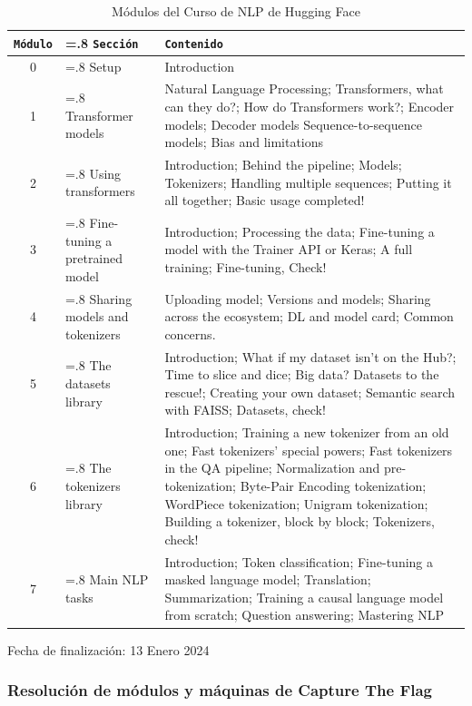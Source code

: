 \begin{table}[H] 
\centering
\footnotesize
\label{tab:nlp_course_structure}
\begin{tabularx}{\textwidth}{|c|>{\hsize=.8\hsize}X|>{\hsize=1.2\hsize}X|}
\hline
\rowcolor{graylight}\texttt{Módulo} & \texttt{Sección} & \texttt{Contenido} \\
\hline
0 & Setup & Introduction \\
\hline
1 & Transformer models & Natural Language Processing; Transformers, what can they do?; How do Transformers work?; Encoder models; Decoder models
Sequence-to-sequence models; Bias and limitations \\
\hline
2 & Using transformers & Introduction; Behind the pipeline; Models; Tokenizers; Handling multiple sequences; Putting it all together; Basic usage completed! \\
\hline
3 & Fine-tuning a pretrained model & Introduction; Processing the data; Fine-tuning a model with the Trainer API or Keras; A full training; Fine-tuning, Check! \\
\hline
4 & Sharing models and tokenizers & Uploading model; Versions and models; Sharing across the ecosystem; DL and model card; Common concerns. \\
\hline
5 & The datasets library & Introduction; What if my dataset isn't on the Hub?; Time to slice and dice; Big data? Datasets to the rescue!; Creating your own dataset; Semantic search with FAISS; Datasets, check!  \\
\hline
6 & The tokenizers library & Introduction; Training a new tokenizer from an old one; Fast tokenizers' special powers; Fast tokenizers in the QA pipeline; Normalization and pre-tokenization; Byte-Pair Encoding tokenization; WordPiece tokenization; Unigram tokenization; Building a tokenizer, block by block; Tokenizers, check! \\
\hline
7 & Main NLP tasks & Introduction; Token classification; Fine-tuning a masked language model; Translation; Summarization; Training a causal language model from scratch; Question answering; Mastering NLP  \\
\hline
\end{tabularx}
\caption{Módulos del Curso de NLP de Hugging Face \cite{huggingface2023nlp}}
\end{table}

Fecha de finalización: 13 Enero 2024

\newpage

\subsubsection*{Resolución de módulos y máquinas de Capture The Flag}

